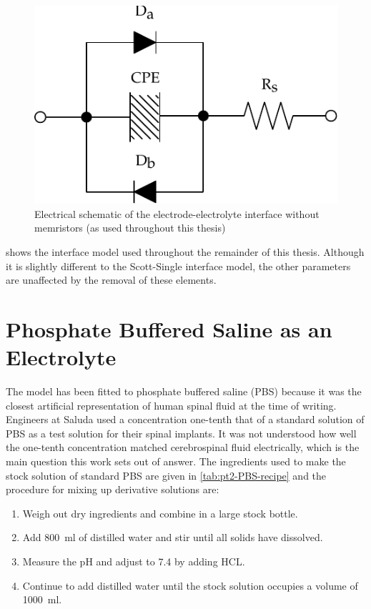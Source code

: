     \begin{figure}
      \centering
      \includegraphics{content/pt2/07-InterfaceModel/graphics/interfaceSchematic_noMemristive}
      \caption{\label{fig:pt2-interfaceSchematic_noMemristive}Electrical schematic of the electrode-electrolyte interface without memristors (as used throughout this thesis)}
    \end{figure}

     shows the interface model used throughout the remainder of this thesis.
    Although it is slightly different to the Scott-Single interface model, the other parameters are unaffected by the removal of these elements.



\section{Phosphate Buffered Saline as an Electrolyte}


  The model has been fitted to phosphate buffered saline (PBS) because it was the closest artificial representation of human spinal fluid at the time of writing.
  Engineers at Saluda used a concentration one-tenth that of a standard solution of PBS as a test solution for their spinal implants.
  It was not understood how well the one-tenth concentration matched cerebrospinal fluid electrically, which is the main question this work sets out of answer.
  The ingredients used to make the stock solution of standard PBS are given in \cref{tab:pt2-PBS-recipe} and the procedure for mixing up derivative solutions are:
  \begin{enumerate}
    \item Weigh out dry ingredients and combine in a large stock bottle.
    \item Add \SI{800}{\milli\litre} of distilled water and stir until all solids have dissolved.
    \item Measure the pH and adjust to 7.4 by adding HCL.
    \item Continue to add distilled water until the stock solution occupies a volume of \SI{1000}{\milli\litre}.
  \end{enumerate}

